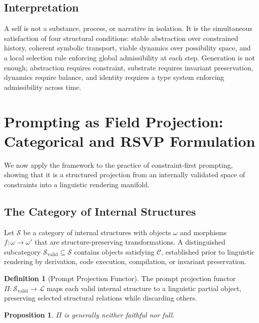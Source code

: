 \documentclass[12pt, a4paper]{article}
\theoremstyle{plain}
\newtheorem{proposition}[theorem]{Proposition}
\theoremstyle{definition}
\newtheorem{definition}[theorem]{Definition}
\theoremstyle{remark}
\begin{document}
\subsection{Interpretation}

A self is not a substance, process, or narrative in isolation. It is the simultaneous satisfaction of four structural conditions: stable abstraction over constrained history, coherent symbolic transport, viable dynamics over possibility space, and a local selection rule enforcing global admissibility at each step. Generation is not enough; abstraction requires constraint, substrate requires invariant preservation, dynamics require balance, and identity requires a type system enforcing admissibility across time.

\section{Prompting as Field Projection: Categorical and RSVP Formulation}

We now apply the framework to the practice of constraint-first prompting, showing that it is a structured projection from an internally validated space of constraints into a linguistic rendering manifold.

\subsection{The Category of Internal Structures}

Let $\mathcal{S}$ be a category of internal structures with objects $\omega$ and morphisms $f : \omega \to \omega'$ that are structure-preserving transformations. A distinguished subcategory $\mathcal{S}_{\mathrm{valid}} \subseteq \mathcal{S}$ contains objects satisfying $\mathcal{C}$, established prior to linguistic rendering by derivation, code execution, compilation, or invariant preservation.

\begin{definition}[Prompt Projection Functor]
The prompt projection functor $\Pi : \mathcal{S}_{\mathrm{valid}} \to \mathcal{L}$ maps each valid internal structure to a linguistic partial object, preserving selected structural relations while discarding others.
\end{definition}

\begin{proposition}
$\Pi$ is generally neither faithful nor full.
\end{proposition}
\end{document}

